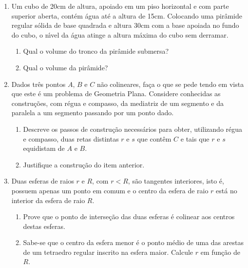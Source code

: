 \documentclass[a4paper,5pt]{amsbook}
\begin{document}
\vspace{1cm}
\begin{enumerate}
    \item Um cubo de 20cm de altura, apoiado em um piso horizontal e com parte
        superior aberta, cont\'em \'agua at\'e a altura de 15cm. Colocando uma
        pir\^amide regular s\'olida de base quadrada e altura 30cm com a base
        apoiada no fundo do cubo, o n\'{\i}vel da \'agua atinge a altura m\'axima do
        cubo sem derramar.
        \begin{enumerate}
            \vspace{0.3cm}
            \item Qual o volume do tronco da pir\^amide submersa?
            \vspace{0.3cm}
            \item Qual o volume da pir\^amide?
        \end{enumerate}

    \vspace{0.5cm}
    \item Dados tr\^es pontos $A$, $B$ e $C$ n\~ao colineares, fa\c{c}a o que se pede
        tendo em vista que este \'e um problema de Geometria Plana. Considere
        conhecidas as constru\c{c}\~oes, com r\'egua e compasso, da mediatriz de um
        segmento e da paralela a um segmento passando por um ponto dado.
        \begin{enumerate}
            \vspace{0.3cm}
            \item Descreve os passos de constru\c{c}\~ao necess\'arios para obter,
                utilizando r\'egua e compasso, duas retas distintas $r$ e $s$ que
                cont\^em $C$ e tais que $r$ e $s$ equidistam de $A$ e $B$.
            \vspace{0.3cm}
            \item Justifique a constru\c{c}\~ao do item anterior.
        \end{enumerate}

    \vspace{0.5cm}
    \item Duas esferas de raios $r$ e $R$, com $r<R$, s\~ao tangentes interiores,
        isto \'e, possuem apenas um ponto em comum e o centro da esfera de raio
        $r$ est\'a no interior da esfera de raio $R$.
        \begin{enumerate}
            \vspace{0.3cm}
            \item Prove que o ponto de interse\c{c}\~ao das duas esferas \'e colinear
                aos centros destas esferas.
            \vspace{0.3cm}
            \item Sabe-se que o centro da esfera menor \'e o ponto m\'edio de uma
                das arestas de um tetraedro regular inscrito na esfera maior.
                Calcule $r$ em fun\c{c}\~ao de $R$.


\end{enumerate}
\end{enumerate}
\end{document}
